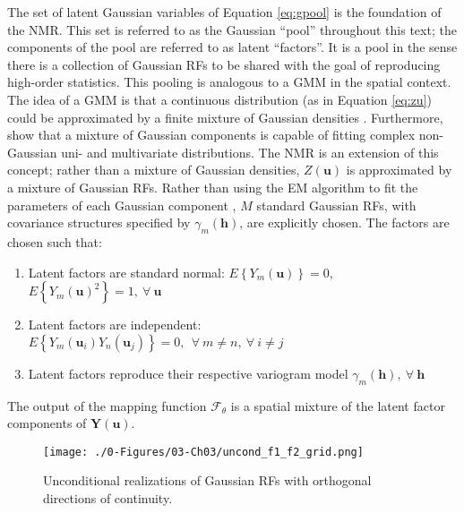 The set of latent Gaussian variables of Equation \ref{eq:gpool} is the foundation of the \gls{NMR}. This set is referred to as the Gaussian ``pool'' throughout this text; the components of the pool are referred to as latent ``factors''. It is a pool in the sense there is a collection of Gaussian \glspl{RF} to be shared with the goal of reproducing high-order statistics. This pooling is analogous to a \gls{GMM} in the spatial context. The idea of a \gls{GMM} is that a continuous distribution (as in Equation \ref{eq:zu}) could be approximated by a finite mixture of Gaussian densities \citep{mclachlan2019finite}. Furthermore, \cite{silva2018multivariate} show that a mixture of Gaussian components is capable of fitting complex non-Gaussian uni- and multivariate distributions. The \gls{NMR} is an extension of this concept; rather than a mixture of Gaussian densities, $Z(\mathbf{u})$ is approximated by a mixture of Gaussian \glspl{RF}. Rather than using the \gls{EM} algorithm to fit the parameters of each Gaussian component \citep{mclachlan2019finite}, $M$ standard Gaussian \glspl{RF}, with covariance structures specified by $\gamma_{m}(\mathbf{h})$, are explicitly chosen. The factors are chosen such that:
\begin{enumerate}[noitemsep]
    \item Latent factors are standard normal: $E\left\{Y_{m}(\mathbf{u})\right\}=0$, \ $E\left\{Y_{m}(\mathbf{u})^{2}\right\}=1, \ \forall \ \mathbf{u}$
    \item Latent factors are independent: $E\left\{Y_{m}(\mathbf{u}_{i})Y_{n}(\mathbf{u}_{j})\right\}=0, \ \ \forall \ m\neq n, \ \forall \ i \neq j$
    \item Latent factors reproduce their respective variogram model $\gamma_m(\mathbf{h}), \ \forall \ \mathbf{h}$
\end{enumerate}
The output of the mapping function $\mathcal{F}_{\theta}$ is a spatial mixture of the latent factor components of $\mathbf{Y}(\mathbf{u})$.

\begin{figure}[htb!]
    \centering
    \texttt{[image: ./0-Figures/03-Ch03/uncond\_f1\_f2\_grid.png]}
    \caption{Unconditional realizations of Gaussian \glspl{RF} with orthogonal directions of continuity.}
    \label{fig:uncond_f1_f2_grid}
\end{figure}

